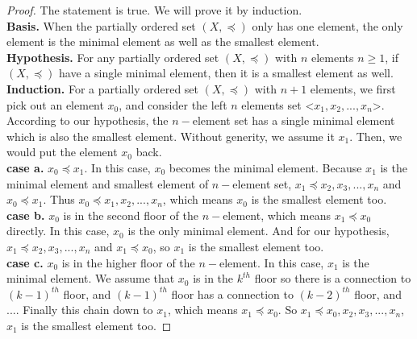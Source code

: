 \documentclass[12pt]{article}
\begin{document}
\begin{proof}
    The statement is true. We will prove it by induction.
    \\\textbf{Basis.} When the partially ordered set $(X,\preceq)$ only has one element, the only element is the minimal element as well as the smallest element.
    \\\textbf{Hypothesis.} For any partially ordered set $(X,\preceq)$ with $n$ elements $n\geqslant 1$, if $(X,\preceq)$ have a single minimal element, then it is a smallest element as well.
    \\\textbf{Induction.} For a partially ordered set $(X,\preceq)$ with $n+1$ elements, we first pick out an element $x_0$, and consider the left $n$ elements set <$x_1,x_2,...,x_n$>. According to our hypothesis, the $n-$element set has a single minimal element which is also the smallest element. Without generity, we assume it $x_1$. Then, we would put the element $x_0$ back.
    \\\textbf{case a.} $x_0 \preceq x_1$. In this case, $x_0$ becomes the minimal element. Because $x_1$ is the minimal element and smallest element of $n-$element set, $x_1 \preceq x_2,x_3,...,x_n$ and $x_0\preceq x_1$. Thus $x_0 \preceq x_1,x_2,...,x_n$, which means $x_0$ is the smallest element too.
    \\\textbf{case b.} $x_0$ is in the second floor of the $n-$element, which means $x_1\preceq x_0$ directly. In this case, $x_0$ is the only minimal element. And for our hypothesis, $x_1 \preceq x_2,x_3,...,x_n$ and $x_1\preceq x_0$, so $x_1$ is the smallest element too.
    \\\textbf{case c.} $x_0$ is in the higher floor of the $n-$element. In this case, $x_1$ is the minimal element. We assume that $x_0$ is in the $k^{th}$ floor so there is a connection to $(k-1)^{th}$ floor, and $(k-1)^{th}$ floor has a connection to $(k-2)^{th}$ floor, and .... Finally this chain down to $x_1$, which means $x_1\preceq x_0$. So $x_1 \preceq x_0,x_2,x_3,...,x_n$, $x_1$ is the smallest element too.
\end{proof}
\end{document}
